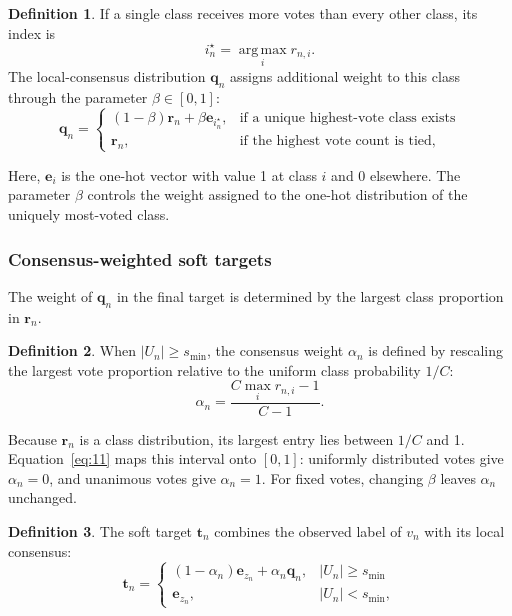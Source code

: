 \documentclass[times,review,10pt]{elsarticle}
\theoremstyle{definition}
\newtheorem{definition}{Definition}
\theoremstyle{plain}
\begin{document}
\begin{definition}
If a single class receives more votes than every other class, its index is
\begin{equation}\label{eq:9}
i_n^\star=\operatorname*{arg\,max}_i r_{n,i}.
\end{equation}
The local-consensus distribution \(\mathbf q_n\) assigns additional weight to this class through the parameter \(\beta\in[0,1]\):
\begin{equation}\label{eq:10}
\mathbf q_n=
\begin{cases}
(1-\beta)\mathbf r_n+\beta\mathbf e_{i_n^\star},&\text{if a unique highest-vote class exists}\\
\mathbf r_n,&\text{if the highest vote count is tied},
\end{cases}
\end{equation}
\end{definition}

Here, \(\mathbf e_i\) is the one-hot vector with value 1 at class \(i\) and 0 elsewhere. The parameter \(\beta\) controls the weight assigned to the one-hot distribution of the uniquely most-voted class.

\subsubsection{Consensus-weighted soft targets}\label{sec:3.3.2}

The weight of \(\mathbf q_n\) in the final target is determined by the largest class proportion in \(\mathbf r_n\).

\begin{definition}
When \(|U_n|\geq s_{\min}\), the consensus weight \(\alpha_n\) is defined by rescaling the largest vote proportion relative to the uniform class probability \(1/C\):
\begin{equation}\label{eq:11}
\alpha_n=\frac{C\max_i r_{n,i}-1}{C-1}.
\end{equation}
\end{definition}

Because \(\mathbf r_n\) is a class distribution, its largest entry lies between \(1/C\) and 1. Equation~\eqref{eq:11} maps this interval onto \([0,1]\): uniformly distributed votes give \(\alpha_n=0\), and unanimous votes give \(\alpha_n=1\). For fixed votes, changing \(\beta\) leaves \(\alpha_n\) unchanged.

\begin{definition}
The soft target \(\mathbf t_n\) combines the observed label of \(v_n\) with its local consensus:
\begin{equation}\label{eq:12}
\mathbf t_n=
\begin{cases}
(1-\alpha_n)\mathbf e_{z_n}+\alpha_n\mathbf q_n,&|U_n|\geq s_{\min}\\
\mathbf e_{z_n},&|U_n|<s_{\min},
\end{cases}
\end{equation}
\end{definition}
\end{document}

